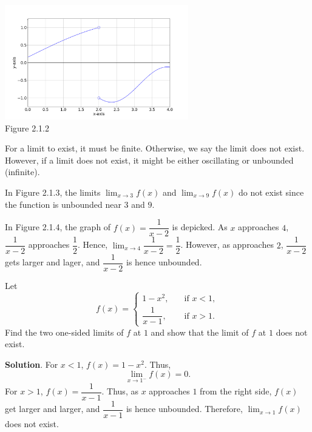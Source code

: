 \documentclass[11pt]{book}
\theoremstyle{break}
\theoremstyle{no_label}
\newcommand{\figtag}[1]{\\[-1.2em]Figure {#1}}
\numberwithin{equation}{section}
\begin{document}
\begin{center}
    \includegraphics[width=0.6\textwidth]{jumpy.png}\figtag{2.1.2}
\end{center}

\begin{remark}
    For a limit to exist, it must be finite. Otherwise, we say the limit does not exist. However, if a limit does not exist, it might be either oscillating or unbounded (infinite).
\end{remark}

\begin{example}
    In Figure 2.1.3, the limits $\displaystyle\lim_{x\to 3} f(x)$ and $\displaystyle\lim_{x\to 9} f(x)$ do not exist since the function is unbounded near $3$ and $9$.
\end{example}

\begin{example}
    In Figure 2.1.4, the graph of $f(x)=\dfrac{1}{x-2}$ is depicked. As $x$ approaches $4$, $\dfrac{1}{x-2}$ approaches $\dfrac{1}{2}$. Hence, $\displaystyle\lim_{x\to 4}\dfrac{1}{x-2}=\dfrac{1}{2}$. However, as approaches $2$, $\dfrac{1}{x-2}$ gets larger and lager, and $\dfrac{1}{x-2}$ is hence unbounded.
\end{example}

\begin{example}
    Let $$f(x)=\left\{\begin{array}{rl}
        1-x^2, \quad & \text{if $x<1$},\\\dfrac{1}{x-1}, \quad & \text{if $x>1$}.
    \end{array}\right.$$ Find the two one-sided limits of $f$ at $1$ and show that the limit of $f$ at $1$ does not exist.
\end{example}
\textbf{Solution}. For $x<1$, $f(x)=1-x^2$. Thus, $$\lim_{x\to1^-}f(x)=0.$$ For $x>1$, $f(x)=\dfrac{1}{x-1}$. Thus, as $x$ approaches $1$ from the right side, $f(x)$ get larger and larger, and $\dfrac{1}{x-1}$ is hence unbounded. Therefore, $\displaystyle\lim_{x\to 1}f(x)$ does not exist.
\end{document}
